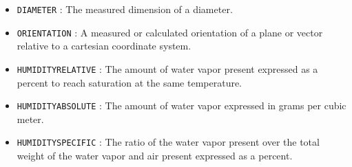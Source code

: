 \begin{itemize}
\item \texttt{DIAMETER} : The measured dimension of a diameter. 

\item \texttt{ORIENTATION} : A measured or calculated orientation of a plane or vector relative to a cartesian coordinate system. 

\item \texttt{HUMIDITY\textunderscore RELATIVE} : The amount of water vapor present expressed as a percent to reach saturation at the same temperature. 

\item \texttt{HUMIDITY\textunderscore ABSOLUTE} : The amount of water vapor expressed in grams per cubic meter. 

\item \texttt{HUMIDITY\textunderscore SPECIFIC} : The ratio of the water vapor present over the total weight of the water vapor and air present expressed as a percent. 

\end{itemize}

\FloatBarrier
